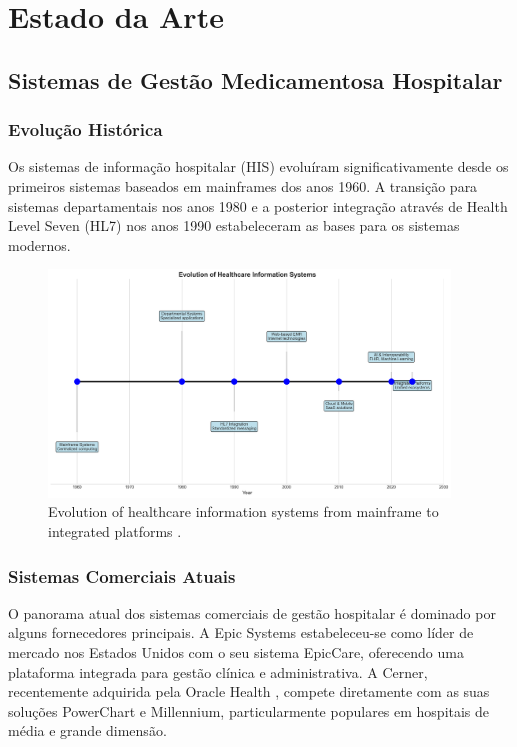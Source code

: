 \chapter{Estado da Arte}


\section{Sistemas de Gestão Medicamentosa Hospitalar}

\subsection{Evolução Histórica}

Os sistemas de informação hospitalar (HIS) evoluíram significativamente desde os primeiros sistemas baseados em mainframes dos anos 1960. A transição para sistemas departamentais nos anos 1980 e a posterior integração através de Health Level Seven (HL7) \cite{dolin2006,mandl2020} nos anos 1990 estabeleceram as bases para os sistemas modernos.

\begin{figure}[htbp]
    \centering
    \includegraphics[width=0.95\textwidth]{images/generated/healthcare_it_timeline.png}
    \caption{Evolution of healthcare information systems from mainframe to integrated platforms \citep{shermock2023,vaghasiya2023}.}
    \label{fig:timeline}
\end{figure}

\subsection{Sistemas Comerciais Atuais}

O panorama atual dos sistemas comerciais de gestão hospitalar é dominado por alguns fornecedores principais. A Epic Systems \cite{hertzum2022} estabeleceu-se como líder de mercado nos Estados Unidos com o seu sistema EpicCare, oferecendo uma plataforma integrada para gestão clínica e administrativa. A Cerner, recentemente adquirida pela Oracle Health \cite{lin2018}, compete diretamente com as suas soluções PowerChart e Millennium, particularmente populares em hospitais de média e grande dimensão.

